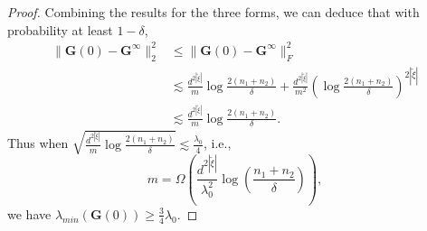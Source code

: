 \documentclass{article}
\begin{document}
\begin{proof}
Combining the results for the three forms, we can deduce that with probability at least $1-\delta$, 
\begin{equation*}
    \begin{aligned}
    \|\mathbf{G}(0)-\mathbf{G}^{\infty}\|_{2}^{2} &\le \|\mathbf{G}(0)-\mathbf{G}^{\infty}\|_{F}^{2} \\
    & \lesssim \frac{d^{2|\tilde{\xi}|}}{m} \log\frac{2(n_1 + n_2)}{\delta} + \frac{d^{2|\tilde{\xi}|}}{m^2}\left(\log\frac{2(n_1 + n_2)}{\delta}\right)^{2|\tilde{\xi}|}\\
    & \lesssim \frac{d^{2|\tilde{\xi}|}}{m} \log\frac{2(n_1 + n_2)}{\delta}.
    \end{aligned}
\end{equation*}
Thus when $ \sqrt{\frac{d^{2|\tilde{\xi}|}}{m} \log\frac{2(n_1 + n_2)}{\delta}}\lesssim \frac{\lambda_0}{4}$, i.e.,
	\begin{equation*}
     m=\Omega\left(\frac{d^{2|\tilde{\xi}|}}{\lambda_0^2}\log\left(\frac{n_1+n_2}{\delta}\right)\right),
    \end{equation*}
	we have $\lambda_{min}(\mathbf{G}(0))\geq \frac{3}{4}\lambda_0 $.
	
\end{proof}
\end{document}
